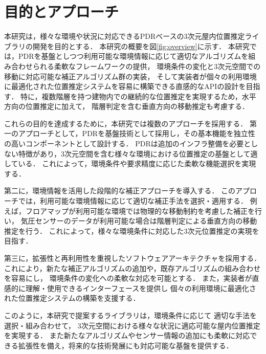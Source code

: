 

\section{目的とアプローチ}

本研究は，様々な環境や状況に対応できるPDRベースの3次元屋内位置推定ライブラリの開発を目的とする．
本研究の概要を図\ref{fig:overview}に示す．
本研究では，PDRを基盤としつつ利用可能な環境情報に応じて適切なアルゴリズムを組み合わせられる柔軟なフレームワークの提供，
環境条件の変化と3次元空間での移動に対応可能な補正アルゴリズム群の実装，
そして実装者が個々の利用環境に最適化された位置推定システムを容易に構築できる直感的なAPIの設計を目指す．
特に，複数階層を持つ建物内での継続的な位置推定を実現するため，水平方向の位置推定に加えて，
階層判定を含む垂直方向の移動推定も考慮する．

これらの目的を達成するために，本研究では複数のアプローチを採用する．
第一のアプローチとして，PDRを基盤技術として採用し，その基本機能を独立性の高いコンポーネントとして設計する．
PDRは追加のインフラ整備を必要としない特徴があり，3次元空間を含む様々な環境における位置推定の基盤として適している．
これによって，環境条件や要求精度に応じた柔軟な機能選択を実現する．

第二に，環境情報を活用した段階的な補正アプローチを導入する．
このアプローチでは，利用可能な環境情報に応じて適切な補正手法を選択・適用する．
例えば，フロアマップが利用可能な環境では物理的な移動制約を考慮した補正を行い，
気圧センサーのデータが利用可能な場合は階層判定による垂直方向の移動推定を行う．
これによって，様々な環境条件に対応した3次元位置推定の実現を目指す．

第三に，拡張性と再利用性を重視したソフトウェアアーキテクチャを採用する．
これにより，新たな補正アルゴリズムの追加や，既存アルゴリズムの組み合わせを容易にし，
環境条件の変化への柔軟な対応を可能とする．
また，実装者が直感的に理解・使用できるインターフェースを提供し
個々の利用環境に最適化された位置推定システムの構築を支援する．

このように，本研究で提案するライブラリは，環境条件に応じて
適切な手法を選択・組み合わせて，
3次元空間における様々な状況に適応可能な屋内位置推定を実現する．
また新たなアルゴリズムやセンサー情報の追加にも柔軟に対応できる拡張性を備え，将来的な技術発展にも対応可能な基盤を提供する．


